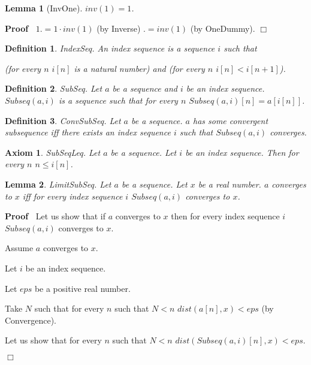 \documentclass{article}
\newenvironment{forthel}{\begin{leftbar}}{\end{leftbar}}
\newenvironment{proof}{\noindent\textbf{Proof\ }}{\hspace*{\fill}$\Box$\medskip}
\newtheorem{axiom}{Axiom}
\newtheorem{lemma}{Lemma}
\newtheorem{definition}{Definition}
\begin{document}
\begin{forthel}
	
	\begin{lemma} [InvOne]
	$inv(1) = 1$.
	\end{lemma}
	\begin{proof}
	$1 .= 1 \cdot inv(1)$ (by Inverse)
	$.= inv(1)$ (by OneDummy).
	\end{proof}   
	
\end{forthel}

\begin{forthel}
	
	\begin{definition}
		IndexSeq.
		An index sequence is a sequence $i$ such that
		
		(for every $n$ $i[n]$ is a natural number) and (for every $n$ $i[n] < i[n + 1]$).
	\end{definition}

	\begin{definition}
		SubSeq.
		Let $a$ be a sequence and $i$ be an index sequence. $Subseq(a,i)$ is a sequence such that for every $n$
		$Subseq(a,i)[n] = a[i[n]]$.
	\end{definition}
	
	\begin{definition}
		ConvSubSeq.
		Let $a$ be a sequence. $a$ has some convergent subsequence iff there exists an index sequence $i$ such that $Subseq(a,i)$ converges.
	\end{definition}
	
	\begin{axiom}
		SubSeqLeq.
		Let $a$ be a sequence. Let $i$ be an index sequence. Then for every $n$ $n \leq i[n]$.
	\end{axiom}
	
	\begin{lemma}
		LimitSubSeq.
		Let $a$ be a sequence. Let $x$ be a real number. $a$ converges to $x$ iff for every index sequence $i$ $Subseq(a,i)$ converges to $x$.
	\end{lemma}
	\begin{proof}
		Let us show that if $a$ converges to $x$ then for every index sequence $i$ $Subseq(a,i)$ converges to $x$.
		
			Assume $a$ converges to $x$.
			
			Let $i$ be an index sequence.
			
			Let $eps$ be a positive real number.
			
			Take $N$ such that for every $n$ such that $N < n$ $dist(a[n],x) < eps$ (by Convergence).
		
			Let us show that for every $n$ such that $N < n$ $dist(Subseq(a,i)[n],x) < eps$.
			

\end{proof}
\end{forthel}
\end{document}
